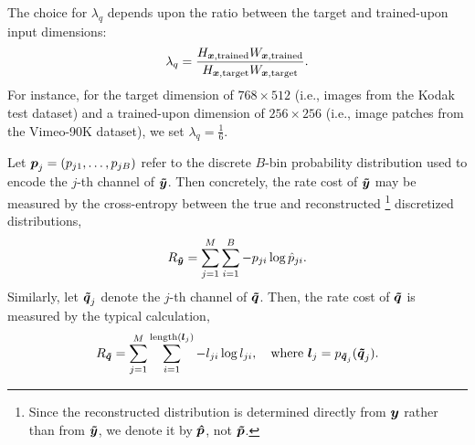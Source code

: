 The choice for $\lambda_q$ depends upon the ratio between the target and trained-upon input dimensions:
\begin{equation*}
  \lambda_q =
  \frac%
  {H_{\boldvar{x}, \mathrm{trained}} W_{\boldvar{x}, \mathrm{trained}}}%
  {H_{\boldvar{x}, \mathrm{target}} W_{\boldvar{x}, \mathrm{target}}}.
\end{equation*}
For instance, for the target dimension of $768 \times 512$ (i.e., images from the Kodak test dataset) and a trained-upon dimension of $256 \times 256$ (i.e., image patches from the Vimeo-90K dataset), we set $\lambda_q = \frac{1}{6}$.

Let ${\boldsymbol{p}}_j = (p_{j1}, \ldots, p_{jB})$ refer to the discrete $B$-bin probability distribution
used to encode the $j$-th channel of ${\boldsymbol{\tilde{y}}}$.
Then concretely, the rate cost of ${\boldsymbol{\tilde{y}}}$ may be measured by the cross-entropy between the true and reconstructed%
\footnote{Since the reconstructed distribution is determined directly from ${\boldsymbol{y}}$ rather than from ${\boldsymbol{\tilde{y}}}$, we denote it by ${\boldsymbol{\hat{p}}}$, not ${\boldsymbol{\tilde{p}}}$.}
discretized distributions,
\begin{equation*}
  R_{\boldvar{\tilde{y}}}  %
  =
  \sum_{j=1}^{M}
  \sum_{i=1}^{B}  %
  -p_{ji} \log \hat{p}_{ji}.
\end{equation*}
Similarly, let ${\boldsymbol{\tilde{q}}}_j$ denote the $j$-th channel of ${\boldsymbol{\tilde{q}}}$.
Then, the rate cost of ${\boldsymbol{\tilde{q}}}$ is measured by the typical calculation,
\begin{equation*}
  R_{\boldvar{\tilde{q}}}  %
  =
  \sum_{j=1}^{M}
  \sum_{i=1}^{\operatorname{length}(\boldvar{l}_j)}
  -{l_{ji}} \log {l_{ji}},
  \quad \text{where } {\boldvar{l}_j} = p_{\boldvar{\tilde{q}}_j}(\boldvar{\tilde{q}}_j).
\end{equation*}



